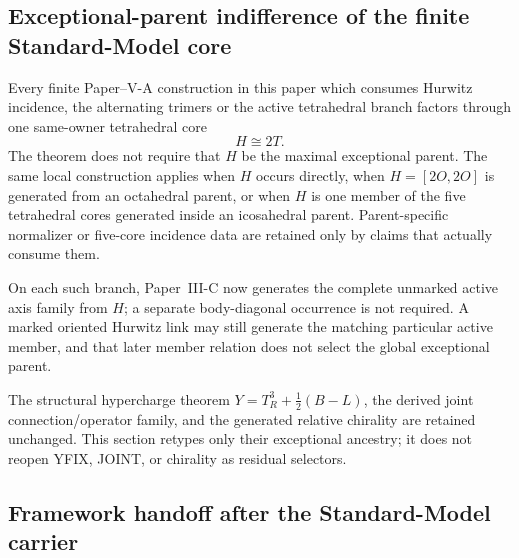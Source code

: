 \documentclass[12pt,a4paper]{article}
\begin{document}
\subsection{Exceptional-parent indifference of the finite Standard-Model core}
\label{p5:sec:v236-parent-indifference}
\begin{theorem}
\label{p5:thm:v236-local-core-parent-indifference}
Every finite Paper--V-A construction in this paper which consumes Hurwitz
incidence, the alternating trimers or the active tetrahedral branch factors
through one same-owner tetrahedral core
\[
 H\cong2T.
\]
The theorem does not require that \(H\) be the maximal exceptional parent.
The same local construction applies when \(H\) occurs directly, when
\(H=[2O,2O]\) is generated from an octahedral parent, or when \(H\) is one
member of the five tetrahedral cores generated inside an icosahedral parent.
Parent-specific normalizer or five-core incidence data are retained only by
claims that actually consume them.

On each such branch, Paper~III-C now generates the complete unmarked active
axis family from \(H\); a separate body-diagonal occurrence is not required.
A marked oriented Hurwitz link may still generate the matching particular
active member, and that later member relation does not select the global
exceptional parent.
\end{theorem}

\begin{remark}
\label{p5:rem:v236-preserved-closures}
The structural hypercharge theorem \(Y=T_R^3+\frac12(B-L)\), the derived joint
connection/operator family, and the generated relative chirality are retained
unchanged.  This section retypes only their exceptional ancestry; it does not
reopen YFIX, JOINT, or chirality as residual selectors.
\end{remark}


\subsection{Framework handoff after the Standard-Model carrier}
\label{p5:sec:framework-handoff}
\end{document}
